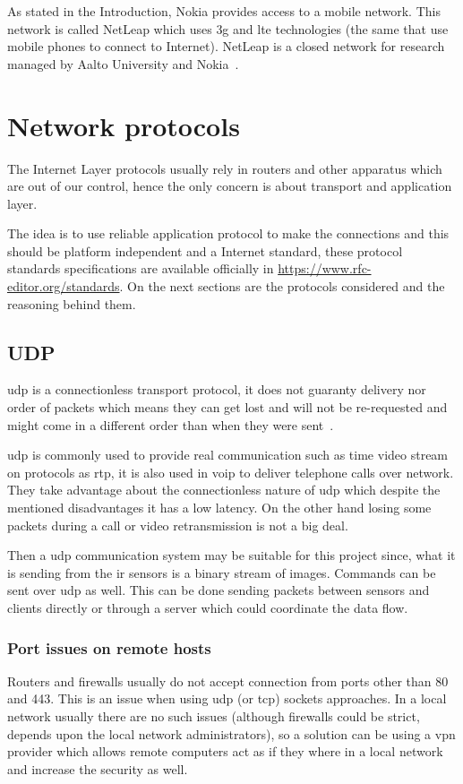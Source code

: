 \documentclass[hidelinks,11pt,a4paper,oneside,article]{memoir}
\begin{document}
As stated in the Introduction, Nokia provides access to a mobile network. This network is called NetLeap which uses \gls{3g} and \gls{lte} technologies (the same that use mobile phones to connect to Internet). NetLeap is a closed network for research managed by Aalto University and Nokia~\cite{netleap}.

\section{Network protocols}
The Internet Layer protocols usually rely in routers and other apparatus which are out of our control, hence the only concern is about transport and application layer.

The idea is to use reliable application protocol to make the connections and this should be platform independent and a Internet standard, these protocol standards specifications are available officially in \url{https://www.rfc-editor.org/standards}. On the next sections are the protocols considered and the reasoning behind them.


\subsection{UDP}
\Gls{udp} is a connectionless transport protocol, it does not guaranty delivery nor order of packets which means they can get lost and will not be re-requested and might come in a different order than when they were sent~\cite[18]{tcpip}.

\gls{udp} is commonly used to provide real communication such as time video stream on protocols as \gls{rtp}, it is also used in \gls{voip} to deliver telephone calls over network. They take advantage about the connectionless nature of \gls{udp} which despite  the mentioned disadvantages it has a low latency. On the other hand losing some packets during a call or video retransmission is not a big deal. 

Then a \gls{udp} communication system may be suitable for this project since, what it is sending from the \gls{ir} sensors is a binary stream of images. Commands can be sent over \gls{udp} as well.
This can be done sending packets between sensors and clients directly or through a server which could coordinate the data flow.

\subsubsection{Port issues on remote hosts}\label{sec:port-issues-on-remote-hosts}
Routers and firewalls usually do not accept connection from ports other than 80 and 443. This is an issue when using \gls{udp} (or \gls{tcp}) sockets approaches. In a local network usually there are no such issues (although firewalls could be strict, depends upon the local network administrators), so a solution can be using a \gls{vpn} provider which allows remote computers act as if they where in a local network and increase the security as well.
\end{document}
